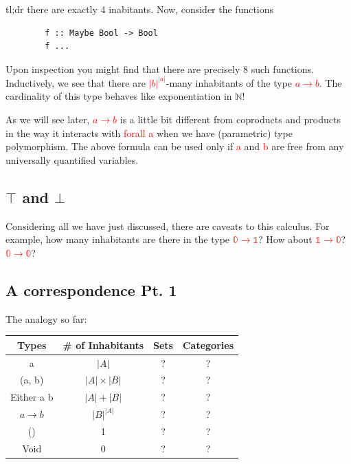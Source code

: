 \documentclass[tikz]{beamer}
\newcommand{\zero}{\bm{\mathbb{0}}}
\newcommand{\one}{\bm{\mathbb{1}}}
\newcommand{\red}[1]{\textcolor{red}{#1}}
\newcommand{\mred}[1]{\textcolor{red}{$#1$}}
\theoremstyle{definition}
\begin{document}
\begin{frame}[fragile]

	tl;dr there are exactly 4 inabitants. Now, consider the functions
	
	\begin{verbatim}
		f :: Maybe Bool -> Bool
		f ...
	\end{verbatim}
\end{frame}

\frame
{
	Upon inspection you might find that there are precisely 8 such functions. Inductively, we see that there are \mred{|b|^{|a|}}-many inhabitants of the type \mred{a \to b}. The cardinality of this type behaves like exponentiation in $\mathbb{N}$!
}

\frame
{

As we will see later, \mred{a \to b} is a little bit different from coproducts and products in the way it interacts with \red{forall a} when we have (parametric) type polymorphism. The above formula can be used only if \red{a} and \red{b} are free from any universally quantified variables.

}
\subsection{$\top$ and $\bot$}

\frame
{
	Considering all we have just discussed, there are caveats to this calculus. For example, how many inhabitants are there in the type \mred{\zero \to \one}? How about \mred{\one \to \zero}? \mred{\zero \to \zero}?
}

\subsection{A correspondence Pt. 1}
\frame
{
	The analogy so far: 
	
	\begin{center}
		\begin{tabular}{|c|c|c|c|}
			\hline
			Types & \# of Inhabitants  & Sets & Categories \\
			\hline a       & $|A|$ & ?  & ? \\
			(a, b) &  $|A| \times |B| $ & ? & ? \\
			Either a b & $|A| + |B|$ & ? & ? \\
			$a \to b$ & $|B|^{|A|}$ & ? & ? \\
			() & 1 & ? & ? \\
			Void & 0 & ? & ? \\ \hline
		\end{tabular}
	\end{center}

}
\end{document}
